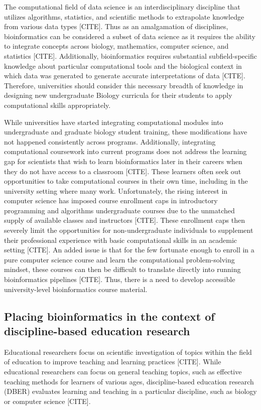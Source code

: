 The computational field of data science is an interdisciplinary discipline that utilizes algorithms, statistics, and scientific methods to extrapolate knowledge from various data types [CITE]. Thus as an amalgamation of disciplines, bioinformatics can be considered a subset of data science as it requires the ability to integrate concepts across biology, mathematics, computer science, and statistics [CITE]. Additionally, bioinformatics requires substantial subfield-specific knowledge about particular computational tools and the biological context in which data was generated to generate accurate interpretations of data [CITE]. Therefore, universities should consider this necessary breadth of knowledge in designing new undergraduate Biology curricula for their students to apply computational skills appropriately. 

While universities have started integrating computational modules into undergraduate and graduate biology student training, these modifications have not happened consistently across programs. Additionally, integrating computational coursework into current programs does not address the learning gap for scientists that wish to learn bioinformatics later in their careers when they do not have access to a classroom [CITE]. These learners often seek out opportunities to take computational courses in their own time, including in the university setting where many work. Unfortunately, the rising interest in computer science has imposed course enrollment caps in introductory programming and algorithms undergraduate courses due to the unmatched supply of available classes and instructors [CITE]. These enrollment caps then severely limit the opportunities for non-undergraduate individuals to supplement their professional experience with basic computational skills in an academic setting [CITE]. An added issue is that for the few fortunate enough to enroll in a pure computer science course and learn the computational problem-solving mindset, these courses can then be difficult to translate directly into running bioinformatics pipelines [CITE]. Thus, there is a need to develop accessible university-level bioinformatics course material.

\subsection{Placing bioinformatics in the context of discipline-based education research}

Educational researchers focus on scientific investigation of topics within the field of education to improve teaching and learning practices [CITE]. While educational researchers can focus on general teaching topics, such as effective teaching methods for learners of various ages, discipline-based education research (DBER) evaluates learning and teaching in a particular discipline, such as biology or computer science [CITE]. 

